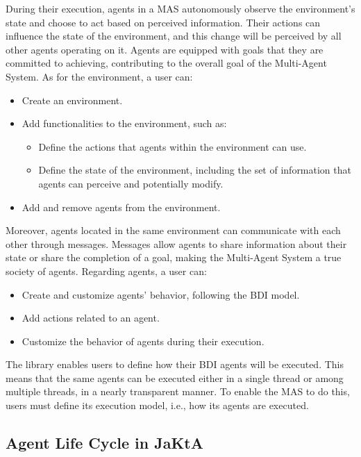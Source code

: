 During their execution, agents in a MAS autonomously observe the environment's state and choose to act based on perceived information. Their actions can influence the state of the environment, and this change will be perceived by all other agents operating on it. Agents are equipped with goals that they are committed to achieving, contributing to the overall goal of the Multi-Agent System. As for the environment, a user can:

\begin{itemize}
    \item Create an environment.
    \item Add functionalities to the environment, such as:
    \begin{itemize}
        \item Define the actions that agents within the environment can use.
        \item Define the state of the environment, including the set of information that agents can perceive and potentially modify.
    \end{itemize}
    \item Add and remove agents from the environment.
\end{itemize}

Moreover, agents located in the same environment can communicate with each other through messages. Messages allow agents to share information about their state or share the completion of a goal, making the Multi-Agent System a true society of agents. Regarding agents, a user can:

\begin{itemize}
    \item Create and customize agents' behavior, following the BDI model.
    \item Add actions related to an agent.
    \item Customize the behavior of agents during their execution.
\end{itemize}

The library enables users to define how their BDI agents will be executed. This means that the same agents can be executed either in a single thread or among multiple threads, in a nearly transparent manner. To enable the MAS to do this, users must define its execution model, i.e., how its agents are executed.

\subsection{Agent Life Cycle in JaKtA}

